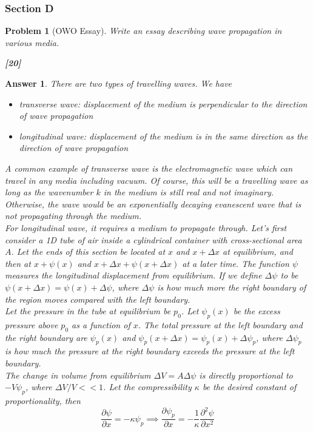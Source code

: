 \documentclass[a4paper]{article}
\newtheorem{ans}{Answer}[subsection]
\theoremstyle{new}
\newtheorem{qns}{Problem}[subsection]
\begin{document}
\subsubsection{Section D}
\begin{qns}[OWO Essay]
Write an essay describing wave propagation in various media.

\hfill\textbf{[20]}
\end{qns}
\begin{ans}
There are two types of travelling waves. We have 
\begin{itemize}
    \item transverse wave:
    displacement of the medium is perpendicular to the direction of wave propagation
    \item longitudinal wave: displacement of the medium is in the same direction as the direction of wave propagation
\end{itemize}
A common example of transverse wave is the electromagnetic wave which can travel in any media including vacuum. Of course, this will be a travelling wave as long as the wavenumber $k$ in the medium is still real and not imaginary. Otherwise, the wave would be an exponentially decaying evanescent wave that is not propagating through the medium.\\[5pt]
For longitudinal wave, it requires a medium to propagate through. Let's first consider a 1D tube of air inside a cylindrical container with cross-sectional area $A$. Let the ends of this section be located at $x$ and $x+\Delta x$ at equilibrium, and then at $x+\psi(x)$ and $x+\Delta x+\psi(x+\Delta x)$ at a later time. The function $\psi$ measures the longitudinal displacement from equilibrium. If we define $\Delta\psi$ to be $\psi(x+\Delta x)=\psi(x)+\Delta\psi$, where $\Delta\psi$ is how much more the right boundary of the region moves compared with the left boundary.\\[5pt]
Let the pressure in the tube at equilibrium be $p_0$. Let $\psi_p(x)$ be the excess pressure above $p_0$ as a function of $x$. The total pressure at the left boundary and the right boundary are $\psi_p(x)$ and $\psi_p(x+\Delta x)=\psi_p(x)+\Delta\psi_p$, where $\Delta\psi_p$ is how much the pressure at the right boundary exceeds the pressure at the left boundary.\\[5pt]
The change in volume from equilibrium $\Delta V=A\Delta\psi$ is directly proportional to $-V\psi_p$, where $\Delta V/V<<1$. Let the compressibility $\kappa$ be the desired constant of proportionality, then $$\frac{\partial\psi}{\partial x}=-\kappa\psi_p\implies\frac{\partial\psi_p}{\partial x}=-\frac{1}{\kappa}\frac{\partial^2\psi}{\partial x^2}$$

\end{ans}
\end{document}
